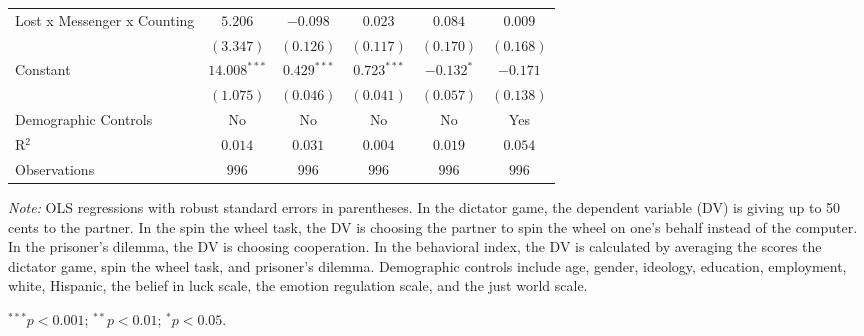 \begin{table}[!t]
\begin{center}
{\begin{threeparttable}
\begin{tabular}{l c c c c c}
Lost x Messenger x Counting & $5.206$        & $-0.098$      & $0.023$       & $0.084$      & $0.009$      \\
                            & $(3.347)$      & $(0.126)$     & $(0.117)$     & $(0.170)$    & $(0.168)$    \\
Constant                    & $14.008^{***}$ & $0.429^{***}$ & $0.723^{***}$ & $-0.132^{*}$ & $-0.171$     \\
                            & $(1.075)$      & $(0.046)$     & $(0.041)$     & $(0.057)$    & $(0.138)$    \\
\midrule
Demographic Controls        & No             & No            & No            & No           & Yes          \\
R$^2$                       & $0.014$        & $0.031$       & $0.004$       & $0.019$      & $0.054$      \\
Observations                & $996$          & $996$         & $996$         & $996$        & $996$        \\
\bottomrule
\end{tabular}
\begin{tablenotes}[flushleft]
\scriptsize{\item[\hspace{-5mm}] \textit{Note:} OLS regressions with robust standard errors in parentheses. 
                                In the dictator game, the dependent variable (DV) is giving up to 50 cents to the partner. 
                                In the spin the wheel task, the DV is choosing the partner to spin the wheel on one’s behalf instead of the computer. 
                                In the prisoner’s dilemma, the DV is choosing cooperation. 
                                In the behavioral index, the DV is calculated by averaging the scores the dictator game, spin the wheel task, and prisoner's dilemma.
                                Demographic controls include age, gender, ideology,
                                education, employment, white, Hispanic, the belief in luck scale, the emotion regulation scale, and the just world scale. \item[\hspace{-5mm}] $^{***}p<0.001$; $^{**}p<0.01$; $^{*}p<0.05$.}
\end{tablenotes}
\end{threeparttable}
}
\label{tab:behavior_opposite_regression_counting}
\end{center}
\end{table}

\renewcommand{\baselinestretch}{1.67}%
